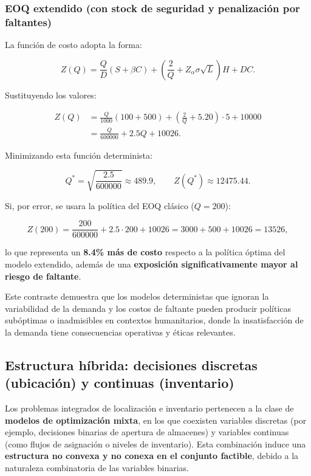 \documentclass[
  spanish,
  us-letterpaper,
]{scrreprt}
\numberwithin{equation}{section}
\begin{document}
\subsubsection{EOQ extendido (con stock de seguridad y penalización por
faltantes)}\label{eoq-extendido-con-stock-de-seguridad-y-penalizaciuxf3n-por-faltantes}

La función de costo adopta la forma:

\[
Z(Q)=\frac{Q}{D}(S+\beta C)+\left(\frac{2}{Q}+Z_{\alpha}\sigma\sqrt{L}\right)H+DC.
\]

Sustituyendo los valores:

\begin{align*}
Z(Q) &= \frac{Q}{1000}(100+500) + \left(\frac{2}{Q} + 5.20\right)\cdot 5 + 10000 \\
     &= \frac{Q}{600000} + 2.5Q + 10026.
\end{align*}

Minimizando esta función determinista:

\[
Q^{\ast}=\sqrt{\frac{2.5}{600000}}\approx489.9,\qquad
Z(Q^{\ast})\approx12475.44.
\]

Si, por error, se usara la política del EOQ clásico (\(Q=200\)):

\[
Z(200)=\frac{200}{600000}+2.5\cdot200+10026
=3000+500+10026=13526,
\]

lo que representa un \textbf{8.4\% más de costo} respecto a la política
óptima del modelo extendido, además de una \textbf{exposición
significativamente mayor al riesgo de faltante}.

Este contraste demuestra que los modelos deterministas que ignoran la
variabilidad de la demanda y los costos de faltante pueden producir
políticas subóptimas o inadmisibles en contextos humanitarios, donde la
insatisfacción de la demanda tiene consecuencias operativas y éticas
relevantes.

\subsection{Estructura híbrida: decisiones discretas (ubicación) y
continuas
(inventario)}\label{estructura-huxedbrida-decisiones-discretas-ubicaciuxf3n-y-continuas-inventario}

Los problemas integrados de localización e inventario pertenecen a la
clase de \textbf{modelos de optimización mixta}, en los que coexisten
variables discretas (por ejemplo, decisiones binarias de apertura de
almacenes) y variables continuas (como flujos de asignación o niveles de
inventario). Esta combinación induce una \textbf{estructura no convexa y
no conexa en el conjunto factible}, debido a la naturaleza combinatoria
de las variables binarias.
\end{document}

